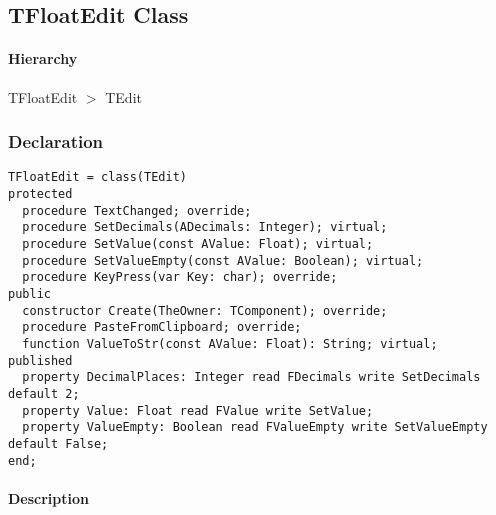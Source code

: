 \documentclass[12pt,a4paper,oneside]{report}
\begin{document}
\subsection{TFloatEdit Class}
\label{lmnumericedits.TFloatEdit}
\paragraph{Hierarchy}\hspace*{\fill}

TFloatEdit {$>$} TEdit
\subsubsection{Declaration}
\begin{verbatim}
TFloatEdit = class(TEdit)
protected
  procedure TextChanged; override;
  procedure SetDecimals(ADecimals: Integer); virtual;
  procedure SetValue(const AValue: Float); virtual;
  procedure SetValueEmpty(const AValue: Boolean); virtual;
  procedure KeyPress(var Key: char); override;
public
  constructor Create(TheOwner: TComponent); override;
  procedure PasteFromClipboard; override;
  function ValueToStr(const AValue: Float): String; virtual;
published
  property DecimalPlaces: Integer read FDecimals write SetDecimals default 2;
  property Value: Float read FValue write SetValue;
  property ValueEmpty: Boolean read FValueEmpty write SetValueEmpty default False;
end;
\end{verbatim}
\paragraph{Description}\hspace*{\fill}
\end{document}

